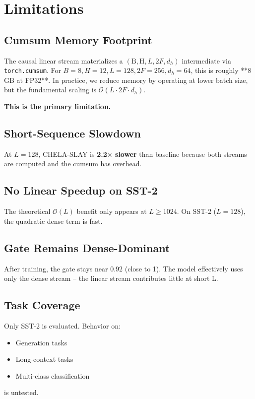 \section{Limitations}

\subsection{Cumsum Memory Footprint}

The causal linear stream materializes a 
$(\text{B}, \text{H}, L, 2F, d_h)$ intermediate via \texttt{torch.cumsum}. For 
$B = 8, H = 12, L = 128, 2F = 256, d_h = 64$, this is roughly **8 GB at 
FP32**. In practice, we reduce memory by operating at lower batch size, but 
the fundamental scaling is $\mathcal{O}(L \cdot 2F \cdot d_h)$.

\textbf{This is the primary limitation.}

\subsection{Short-Sequence Slowdown}

At $L = 128$, CHELA-SLAY is \textbf{2.2$\times$ slower} than baseline because 
both streams are computed and the cumsum has overhead.

\subsection{No Linear Speedup on SST-2}

The theoretical $\mathcal{O}(L)$ benefit only appears at $L \geq 
1024$. On SST-2 ($L = 128$), the quadratic dense term is fast.

\subsection{Gate Remains Dense-Dominant}

After training, the gate stays near $0.92$ (close to 1). The 
model effectively uses only the dense stream -- the linear stream 
contributes little at short L.

\subsection{Task Coverage}

Only SST-2 is evaluated. Behavior on:
\begin{itemize}
\item Generation tasks
\item Long-context tasks
\item Multi-class classification

\end{itemize}
is untested.

